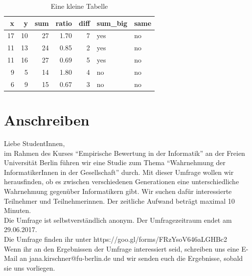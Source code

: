 \documentclass[de]{agse-empir-report}\usepackage[]{graphicx}\usepackage[]{color}
\newenvironment{knitrout}{}{} %
\begin{document}
\begin{table}
    \centering
\begin{knitrout}
\color{fgcolor}
\begin{tabular}{rrrrrll}
\toprule
x & y & sum & ratio & diff & sum\_big & same\\
\midrule
17 & 10 & 27 & 1.70 & 7 & yes & no\\
11 & 13 & 24 & 0.85 & 2 & yes & no\\
11 & 16 & 27 & 0.69 & 5 & yes & no\\
9 & 5 & 14 & 1.80 & 4 & no & no\\
6 & 9 & 15 & 0.67 & 3 & no & no\\
\bottomrule
\end{tabular}


\end{knitrout}
    \caption{Eine kleine Tabelle}
\end{table}

\nocite{*}




\appendix

\section{Anschreiben}

Liebe StudentInnen,\\
im Rahmen des Kurses “Empirische Bewertung in der Informatik” an der Freien Universität Berlin führen wir eine Studie zum Thema “Wahrnehmung der InformatikerInnen in der Gesellschaft” durch. Mit dieser Umfrage wollen wir herausfinden, ob es zwischen verschiedenen Generationen eine unterschiedliche Wahrnehmung gegenüber Informatikern gibt. Wir suchen dafür interessierte Teilnehmer und Teilnehmerinnen. Der zeitliche Aufwand beträgt maximal 10 Minuten.\\
Die Umfrage ist selbstverständlich anonym. Der Umfragezeitraum endet am 29.06.2017.\\

Die Umfrage finden ihr  unter https://goo.gl/forms/FRzYsoV646aLGHBc2 \\

Wenn ihr an den Ergebnissen der Umfrage interessiert seid, schreiben uns eine E-Mail an jana.kirschner@fu-berlin.de und wir senden euch die Ergebnisse, sobald sie uns vorliegen.\\ \\
\end{document}
